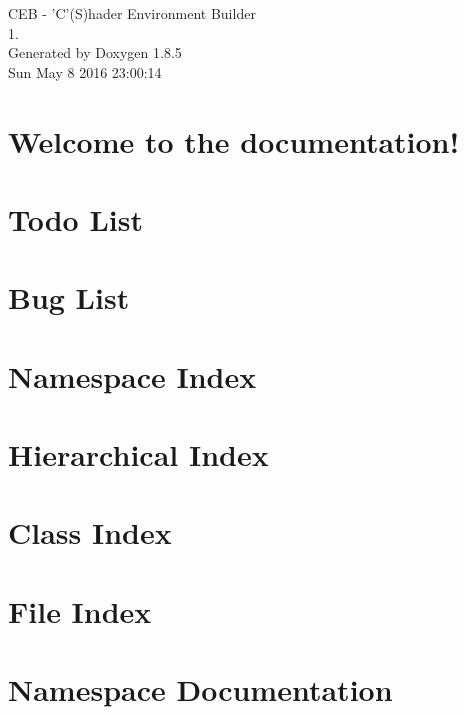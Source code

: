 \documentclass[twoside]{book}
\newcommand{\clearemptydoublepage}{%
  \newpage{\pagestyle{empty}\cleardoublepage}%
}
\begin{document}
\begin{titlepage}
\vspace*{7cm}
\begin{center}%
{\Large C\-E\-B -\/ 'C'(S)hader Environment Builder \\[1ex]\large 1. }\\
\vspace*{1cm}
{\large Generated by Doxygen 1.8.5}\\
\vspace*{0.5cm}
{\small Sun May 8 2016 23:00:14}\\
\end{center}
\end{titlepage}
\clearemptydoublepage
\tableofcontents
\clearemptydoublepage
{}

\chapter{Welcome to the documentation!}
\label{index}
\chapter{Todo List}
\label{todo}

\chapter{Bug List}
\label{bug}

\chapter{Namespace Index}

\chapter{Hierarchical Index}

\chapter{Class Index}

\chapter{File Index}

\chapter{Namespace Documentation}



\end{document}
